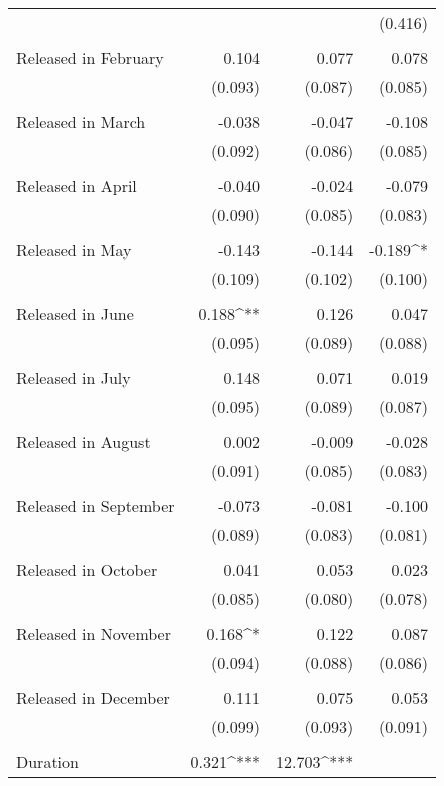 \documentclass{article}
\begin{document}
\begin{table}[!htbp]
\begin{tabular}{@{\extracolsep{5pt}}lD{.}{.}{-3} D{.}{.}{-3} D{.}{.}{-3}}
  &  &  & (0.416) \\ 
  & & & \\ 
 Released in February & 0.104 & 0.077 & 0.078 \\ 
  & (0.093) & (0.087) & (0.085) \\ 
  & & & \\ 
 Released in March & -0.038 & -0.047 & -0.108 \\ 
  & (0.092) & (0.086) & (0.085) \\ 
  & & & \\ 
 Released in April & -0.040 & -0.024 & -0.079 \\ 
  & (0.090) & (0.085) & (0.083) \\ 
  & & & \\ 
 Released in May & -0.143 & -0.144 & -0.189^{*} \\ 
  & (0.109) & (0.102) & (0.100) \\ 
  & & & \\ 
 Released in June & 0.188^{**} & 0.126 & 0.047 \\ 
  & (0.095) & (0.089) & (0.088) \\ 
  & & & \\ 
 Released in July & 0.148 & 0.071 & 0.019 \\ 
  & (0.095) & (0.089) & (0.087) \\ 
  & & & \\ 
 Released in August & 0.002 & -0.009 & -0.028 \\ 
  & (0.091) & (0.085) & (0.083) \\ 
  & & & \\ 
 Released in September & -0.073 & -0.081 & -0.100 \\ 
  & (0.089) & (0.083) & (0.081) \\ 
  & & & \\ 
 Released in October & 0.041 & 0.053 & 0.023 \\ 
  & (0.085) & (0.080) & (0.078) \\ 
  & & & \\ 
 Released in November & 0.168^{*} & 0.122 & 0.087 \\ 
  & (0.094) & (0.088) & (0.086) \\ 
  & & & \\ 
 Released in December & 0.111 & 0.075 & 0.053 \\ 
  & (0.099) & (0.093) & (0.091) \\ 
  & & & \\ 
 Duration & 0.321^{***} & 12.703^{***} &  \\ 

\end{tabular}
\end{table}
\end{document}
